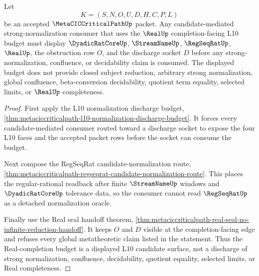 \begin{theorem}
\label{thm:metacic-critical-path-real-completion-sn-budget}
Let
$$
K=(S,N,O,U,D,H,C,P,L)
$$
be an accepted $\MetaCICCriticalPathUp$ packet. Any candidate-mediated strong-normalization consumer that uses the $\RealUp$ completion-facing L10 budget must display $\DyadicRatCoreUp$, $\StreamNameUp$, $\RegSeqRatUp$, $\RealUp$, the obstruction row $O$, and the discharge socket $D$ before any strong-normalization, confluence, or decidability claim is consumed. The displayed budget does not provide closed subject reduction, arbitrary strong normalization, global confluence, beta-conversion decidability, quotient term equality, selected limits, or $\RealUp$ completeness.
\end{theorem}
\begin{proof}
First apply the L10 normalization discharge budget, \autoref{thm:metaciccriticalpath-l10-normalization-discharge-budget}. It forces every candidate-mediated consumer routed toward a discharge socket to expose the four L10 faces and the accepted packet rows before the socket can consume the budget.

Next compose the RegSeqRat candidate-normalization route, \autoref{thm:metaciccriticalpath-regseqrat-candidate-normalization-route}. This places the regular-rational readback after finite $\StreamNameUp$ windows and $\DyadicRatCoreUp$ tolerance data, so the consumer cannot read $\RegSeqRatUp$ as a detached normalization oracle.

Finally use the Real seal handoff theorem, \autoref{thm:metaciccriticalpath-real-seal-no-infinite-reduction-handoff}. It keeps $O$ and $D$ visible at the completion-facing edge and refuses every global metatheoretic claim listed in the statement. Thus the Real-completion budget is a displayed L10 candidate surface, not a discharge of strong normalization, confluence, decidability, quotient equality, selected limits, or Real completeness.
\end{proof}
